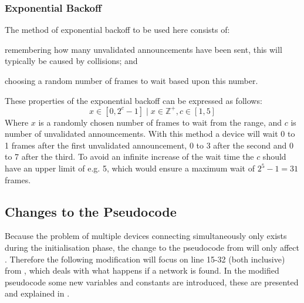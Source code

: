 \subsubsection{Exponential Backoff} %
\label{ssub:exponential_backoff}
The method of exponential backoff to be used here consists of:
\begin{enumerate*}[label=\itshape \alph*\upshape)]
    \item remembering how many unvalidated announcements have been sent, this will typically be caused by collisions; and
    \item choosing a random number of frames to wait based upon this number.   
\end{enumerate*}
These properties of the exponential backoff can be expressed as follows:
\begin{equation}
     x \in [0, 2^c - 1] \mid x \in \mathbb{Z}^+, c \in [1,5]
\end{equation}
Where $x$ is a randomly chosen number of frames to wait from the range, and $c$ is number of unvalidated announcements. With this method a device will wait 0 to 1 frames after the first unvalidated announcement, 0 to 3 after the second and 0 to 7 after the third. To avoid an infinite increase of the wait time the $c$ should have an upper limit of e.g. 5, which would ensure a maximum wait of $2^5-1 = 31$ frames.


\subsection{Changes to the Pseudocode} %
\label{sub:changes_to_the_pseudocode}
Because the problem of multiple devices connecting simultaneously only exists during the initialisation phase, the change to the pseudocode from  will only affect .
Therefore the following modification will focus on line 15-32 (both inclusive) from , which deals with what happens if a network is found.
In the modified pseudocode some new variables and constants are introduced, these are presented and explained in .

